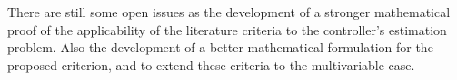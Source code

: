 \documentclass[letterpaper, 10 pt, conference]{ieeeconf}  %
\begin{document}
There are still some open issues as the development of a stronger mathematical proof of the applicability of the literature criteria to the controller's estimation problem.
Also the development of a better mathematical formulation for the proposed criterion, and to extend these criteria to the multivariable case.


\addtolength{\textheight}{-12cm}   %






%





\end{document}
